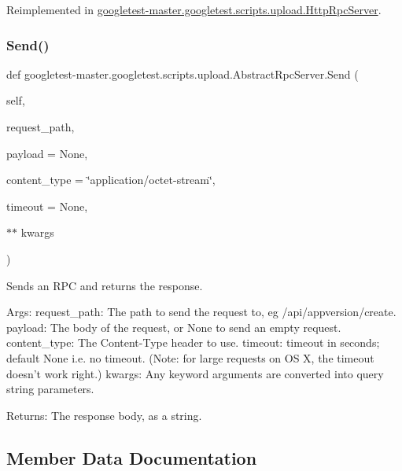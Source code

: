 Reimplemented in \mbox{\hyperlink{classgoogletest-master_1_1googletest_1_1scripts_1_1upload_1_1_http_rpc_server_a32e41ee17da48e04087afd61fc451c74}{googletest-\/master.\+googletest.\+scripts.\+upload.\+Http\+Rpc\+Server}}.

\mbox{\label{classgoogletest-master_1_1googletest_1_1scripts_1_1upload_1_1_abstract_rpc_server_a7e930824ec16c036602fa4abb7ee6f02}} 
\subsubsection{\texorpdfstring{Send()}{Send()}}
{\footnotesize\ttfamily def googletest-\/master.\+googletest.\+scripts.\+upload.\+Abstract\+Rpc\+Server.\+Send (\begin{DoxyParamCaption}\item[{}]{self,  }\item[{}]{request\+\_\+path,  }\item[{}]{payload = {\ttfamily None},  }\item[{}]{content\+\_\+type = {\ttfamily \char`\"{}application/octet-\/stream\char`\"{}},  }\item[{}]{timeout = {\ttfamily None},  }\item[{$\ast$$\ast$}]{kwargs }\end{DoxyParamCaption})}

\begin{DoxyVerb}Sends an RPC and returns the response.

Args:
  request_path: The path to send the request to, eg /api/appversion/create.
  payload: The body of the request, or None to send an empty request.
  content_type: The Content-Type header to use.
  timeout: timeout in seconds; default None i.e. no timeout.
(Note: for large requests on OS X, the timeout doesn't work right.)
  kwargs: Any keyword arguments are converted into query string parameters.

Returns:
  The response body, as a string.
\end{DoxyVerb}
 

\subsection{Member Data Documentation}
\mbox{\label{classgoogletest-master_1_1googletest_1_1scripts_1_1upload_1_1_abstract_rpc_server_a3a4b375efe3c7505f24412461baa954e}} 
